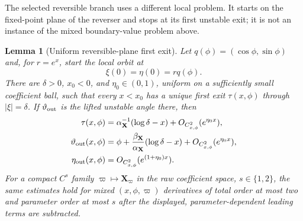 \documentclass[11pt]{amsart}
\numberwithin{equation}{section}
\newtheorem{lemma}[theorem]{Lemma}
\theoremstyle{definition}
\theoremstyle{remark}
\begin{document}
The selected reversible branch uses a different local problem.  It starts
on the fixed-point plane of the reverser and stops at its first unstable
exit; it is not an instance of the mixed boundary-value problem above.

\begin{lemma}[Uniform reversible-plane first exit]
\label{lem:source-first-exit}
Let $q(\phi)=(\cos\phi,\sin\phi)$ and, for $r=e^x$, start the local orbit at
\begin{equation}\label{eq:source-ivp}
 \xi(0)=\eta(0)=r q(\phi).
\end{equation}
There are $\delta>0$, $x_0<0$, and $\eta_0\in(0,1)$, uniform on a
sufficiently small coefficient ball, such that every $x<x_0$
has a unique first exit $\tau(x,\phi)$ through $|\xi|=\delta$.  If
$\vartheta_{\rm out}$ is the lifted unstable angle there, then
\begin{align}
 \tau(x,\phi)
  &=\alpha_{\mathbf X}^{-1}(\log\delta-x)
       +O_{C^2_{x,\phi}}(e^{\eta_0x}),
       \label{eq:source-exit-time}\\
 \vartheta_{\rm out}(x,\phi)
  &=\phi+\frac{\beta_{\mathbf X}}{\alpha_{\mathbf X}}
       (\log\delta-x)
       +O_{C^2_{x,\phi}}(e^{\eta_0x}),
       \label{eq:source-exit-angle}\\
 \eta_{\rm out}(x,\phi)
  &=O_{C^2_{x,\phi}}(e^{(1+\eta_0)x}).
       \label{eq:source-exit-stable}
\end{align}
For a compact $C^s$ family $\varpi\mapsto\mathbf X_\varpi$ in the raw
coefficient space, $s\in\{1,2\}$, the same estimates hold for mixed
$(x,\phi,\varpi)$ derivatives of total order at most
two and parameter order at most $s$ after the displayed,
parameter-dependent leading terms are
subtracted.
\end{lemma}
\end{document}
